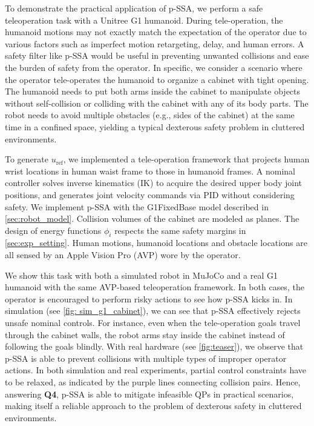 To demonstrate the practical application of p-SSA, we perform a safe teleoperation task with a Unitree G1 humanoid.
During tele-operation, the humanoid motions may not exactly match the expectation of the operator due to various factors such as imperfect motion retargeting, delay, and human errors.
A safety filter like p-SSA would be useful in preventing unwanted collisions and ease the burden of safety from the operator.
In specific, we consider a scenario where the operator tele-operates the humanoid to organize a cabinet with tight opening.
The humanoid needs to put both arms inside the cabinet to manipulate objects without self-collision or colliding with the cabinet with any of its body parts.
The robot needs to avoid multiple obstacles (e.g., sides of the cabinet) at the same time in a confined space, yielding a typical dexterous safety problem in cluttered environments.

To generate $u_\mathrm{ref}$, we implemented a tele-operation framework that projects human wrist locations in human waist frame to those in humanoid frames.
A nominal controller solves inverse kinematics (IK) to acquire the desired upper body joint positions, and generates joint velocity commands via PID without considering safety.
We implement p-SSA with the G1FixedBase model described in \cref{sec:robot_model}.
Collision volumes of the cabinet are modeled as planes.
The design of energy functions $\phi_i$ respects the same safety margins in \cref{sec:exp_setting}.
Human motions, humanoid locations and obstacle locations are all sensed by an Apple Vision Pro (AVP) wore by the operator.

We show this task with both a simulated robot in MuJoCo and a real G1 humanoid with the same AVP-based teleoperation framework.
In both cases, the operator is encouraged to perform risky actions to see how p-SSA kicks in.
In simulation (see \cref{fig: sim_g1_cabinet}), we can see that p-SSA effectively rejects unsafe nominal controls.
For instance, even when the tele-operation goals travel through the cabinet walls, the robot arms stay inside the cabinet instead of following the goals blindly.
With real hardware (see \cref{fig:teaser}), we observe that p-SSA is able to prevent collisions with multiple types of improper operator actions.
In both simulation and real experiments, partial control constraints have to be relaxed, as indicated by the purple lines connecting collision pairs.
Hence, answering \textbf{Q4}, p-SSA is able to mitigate infeasible QPs in practical scenarios, making itself a reliable approach to the problem of dexterous safety in cluttered environments.







